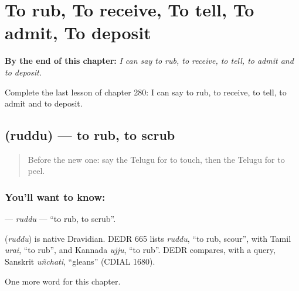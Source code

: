 
\chapter{To rub, To receive, To tell, To admit, To deposit}
\label{ch:te-to-rub-to-receive-to-tell-to-admit-to-deposit}

\begin{chapteropening}
\textbf{By the end of this chapter:} \emph{I can say to rub, to receive, to tell, to admit and to deposit.}

Complete the last lesson of chapter 280: I can say to rub, to receive, to tell, to admit and to deposit.
\end{chapteropening}

\section[\texorpdfstring{\te{రుద్దు} (ruddu)}{రుద్దు (ruddu)}]{ (ruddu) — to rub, to scrub}

\label{lesson:TE-C280-ruddu}



\begin{quote}
Before the new one: say the Telugu for to touch, then the Telugu for to peel.
\end{quote}

\subsection*{You'll want to know: }
\textbf{} — \emph{ruddu} — \textquotedblleft{}to rub, to scrub\textquotedblright{}.

\begin{cousinweb}
\textbf{} (\emph{ruddu}) is native Dravidian. DEDR 665 lists \emph{ruddu}, \textquotedblleft{}to rub, scour\textquotedblright{}, with Tamil \emph{urai}, \textquotedblleft{}to rub\textquotedblright{}, and Kannada \emph{ujju}, \textquotedblleft{}to rub\textquotedblright{}. DEDR compares, with a query, Sanskrit \emph{uñchati}, \textquotedblleft{}gleans\textquotedblright{} (CDIAL 1680).
\end{cousinweb}

\begin{grammarlens}[title={What you've built}]
One more word for this chapter.
\end{grammarlens}

